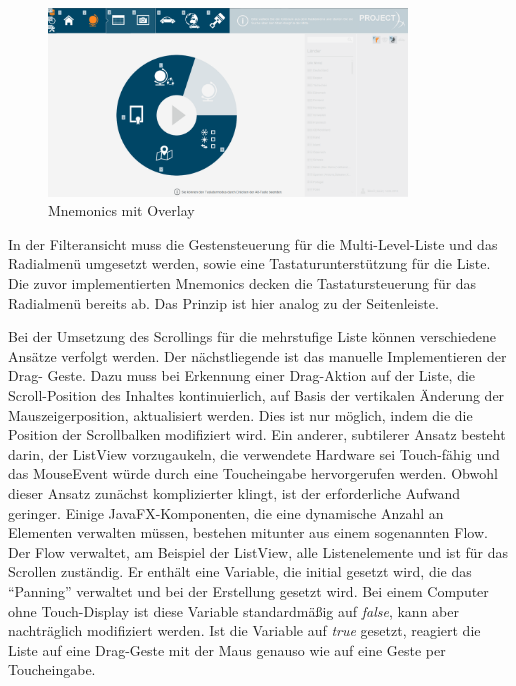 \begin{figure}[H]
 \centering
 \includegraphics[width=0.85\textwidth]{grafiken/mnemonics.png}
 \caption{Mnemonics mit Overlay}
 \label{fig:mnemonicsOverlay}
\end{figure}
In der Filteransicht muss die Gestensteuerung für die Multi-Level-Liste und das Radialmenü umgesetzt werden, sowie eine Tastaturunterstützung für die Liste. Die zuvor implementierten Mnemonics decken die Tastatursteuerung für das Radialmenü bereits ab. Das Prinzip ist hier analog zu der Seitenleiste. \par
Bei der Umsetzung des Scrollings für die mehrstufige Liste können verschiedene Ansätze verfolgt werden. Der nächstliegende ist das manuelle Implementieren der Drag- Geste. Dazu muss bei Erkennung einer Drag-Aktion auf der Liste, die Scroll-Position des Inhaltes kontinuierlich, auf Basis der vertikalen Änderung der Mauszeigerposition, aktualisiert werden. Dies ist nur möglich, indem die die Position der Scrollbalken modifiziert wird. Ein anderer, subtilerer Ansatz besteht darin, der ListView vorzugaukeln, die verwendete Hardware sei Touch-fähig und das MouseEvent würde durch eine Toucheingabe hervorgerufen werden. Obwohl dieser Ansatz zunächst komplizierter klingt, ist der erforderliche Aufwand geringer. Einige JavaFX-Komponenten, die eine dynamische Anzahl an Elementen verwalten müssen, bestehen mitunter aus einem sogenannten Flow. Der Flow verwaltet, am Beispiel der ListView, alle Listenelemente und ist für das Scrollen zuständig. Er enthält eine Variable, die initial gesetzt wird, die das \enquote{Panning} verwaltet und bei der Erstellung gesetzt wird. Bei einem Computer ohne Touch-Display ist diese Variable standardmäßig auf \textit{false}, kann aber nachträglich modifiziert werden. Ist die Variable auf \textit{true} gesetzt, reagiert die Liste auf eine Drag-Geste mit der Maus genauso wie auf eine Geste per Toucheingabe.\par
